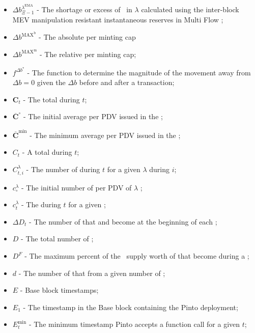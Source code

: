 \documentclass[class=article, crop=false]{standalone}
\begin{document}
\begin{itemize}[topsep=0pt, itemsep=2pt,leftmargin=16pt]
    \item[] $\Delta b_{\Xi-1}^{\lambda^{\text{EMA}}}$ - The shortage or excess of \Pinto\ in $\lambda$ calculated using the inter-block MEV manipulation resistant instantaneous reserves in Multi Flow ;
    \item[] $\Delta b^{\text{MAX}^{\text{b}}}$ - The absolute per  minting cap
    \item[] $\Delta b^{\text{MAX}^{\text{m}}}$ - The relative per  minting cap;
    \item[] $f^{\Delta b^{*}}$ - The function to determine the magnitude of the movement away from $\Delta b = 0$ given the $\Delta b$ before and after a transaction;
    \item[] $\mathbf{C}_{t}$ - The total  during $t$;
    \item[] $\overline{\mathbf{C}}^{\circ}$ - The initial average  per PDV issued in the ;
    \item[] $\overline{\mathbf{C}}^{\text{min}}$ - The minimum average  per PDV issued in the ;
    \item[] $C_{t}$ - A  total  during $t$;
    \item[] $C_{t,i}^{\lambda}$ - The number of  during $t$ for a given $\lambda$   during $i$;
    \item[] $c_{\circ}^{\lambda}$ - The initial number of  per PDV of $\lambda$ ;
    \item[] $c_{t}^{\lambda}$ - The  during $t$ for a given ;
    \item[] $\Delta D_{t}$ - The number of  that  and become  at the beginning of each ;
    \item[] $D$ - The total number of ;
    \item[] $D^{F}$ - The maximum percent of the \Pinto\ supply worth of  that become  during a ;
    \item[] $d$ - The number of  that  from a given number of  \Pinto;
    \item[] $E$ - Base block timestamps;
    \item[] $E_{1}$ - The timestamp in the Base block containing the Pinto deployment;
    \item[] $E_{t}^{\text{min}}$ - The minimum timestamp Pinto accepts a  function call for a given $t$;

\end{itemize}
\end{document}
